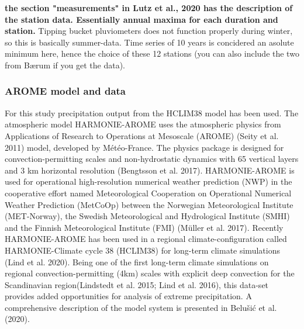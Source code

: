 \textbf{the section "measurements" in Lutz et al., 2020 has the description of the station data. Essentially annual maxima for each duration and station.} Tipping bucket pluviometers does not function properly during winter, so this is basically summer-data. Time series of 10 years is concidered an asolute minimum here, hence the choice of these 12 stations (you can also include the two from Bærum if you get the data). 

\subsubsection{AROME model and data}

For this study precipitation output from the HCLIM38 model has been used.
The atmospheric model HARMONIE-AROME uses the atmospheric physics from Applications of Research to Operations at Mesoscale (AROME) (Seity et al. 2011)\cite{seity_arome} model, developed by Météo-France. The physics package is designed for convection-permitting scales and non-hydrostatic dynamics with 65 vertical layers and 3 km horizontal resolution (Bengtsson et al. 2017)\cite{bengtsson_arome}. HARMONIE-AROME is used for operational high-resolution numerical weather prediction (NWP) in the cooperative effort named Meteorological Cooperation on Operational Numerical Weather Prediction (MetCoOp) between the Norwegian Meteorological Institute (MET-Norway), the Swedish Meteorological and Hydrological Institute (SMHI) and the Finnish Meteorological Institute (FMI) (Müller et al. 2017)\cite{muller}. Recently HARMONIE-AROME has been used in a regional climate-configuration called HARMONIE-Climate cycle 38 (HCLIM38) for long-term climate simulations (Lind et al. 2020)\cite{lind_arome]}. Being one of the first long-term climate simulations on regional convection-permitting (\<4km) scales with explicit deep convection for the Scandinavian region(Lindstedt et al. 2015\cite{lindstedt_hclim}; Lind et al. 2016\cite{lind_hclim}), this data-set provides added opportunities for analysis of extreme precipitation. A comprehensive description of the model system is presented in Belušić et al.(2020)\cite{belusic_hclim}. 


